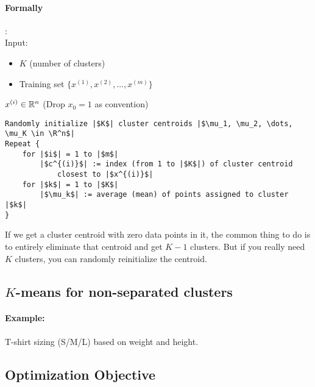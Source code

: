 \paragraph{Formally}:\\
Input:
\begin{itemize}
	\item $K$ (number of clusters)
	\item Training set $\{x^{(1)}, x^{(2)}, \dots, x^{(m)}\}$
\end{itemize}

\begin{remark}
	$x^{(i)} \in \mathbb{R}^n$ (Drop $x_0 = 1$ as convention)
\end{remark}

\begin{verbatim}
Randomly initialize |$K$| cluster centroids |$\mu_1, \mu_2, \dots, \mu_K \in \R^n$|
Repeat {
	for |$i$| = 1 to |$m$|
		|$c^{(i)}$| := index (from 1 to |$K$|) of cluster centroid
			closest to |$x^{(i)}$|
	for |$k$| = 1 to |$K$|
		|$\mu_k$| := average (mean) of points assigned to cluster |$k$|
}
\end{verbatim}

\begin{remark}
	If we get a cluster centroid with zero data points in it, the common thing to do is to
	entirely eliminate that centroid and get $K-1$ clusters. But if you really need $K$
	clusters, you can randomly reinitialize the centroid.
\end{remark}

\subsection{$K$-means for non-separated clusters}
\paragraph{Example:} T-shirt sizing (S/M/L) based on weight and height.

\subsection{Optimization Objective}
